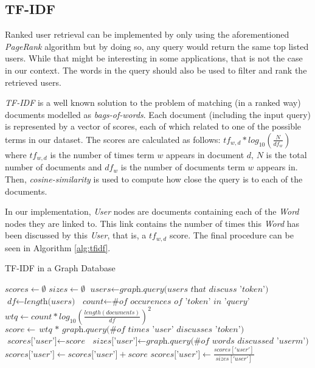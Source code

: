 \subsection{TF-IDF}

Ranked user retrieval can be implemented by only using the aforementioned \emph{PageRank} algorithm but by doing so, any query would return the same top listed users. While that might be interesting in some applications, that is not the case in our context. The words in the query should also be used to filter and rank the retrieved users.

\emph{TF-IDF} is a well known solution to the problem of matching (in a ranked way) documents modelled as \emph{bags-of-words}. Each document (including the input query) is represented by a vector of scores, each of which related to one of the possible terms in our dataset. The scores are calculated as follows: ${tf}_{w, d} * log_{10}(\frac{N}{{df}_{w}})$ where ${tf}_{w, d}$ is the number of times term $w$ appears in document $d$, $N$ is the total number of documents and ${df}_{w}$ is the number of documents term $w$ appears in. Then, \emph{cosine-similarity} is used to compute how close the query is to each of the documents.

In our implementation, \emph{User} nodes are documents containing each of the \emph{Word} nodes they are linked to. This link contains the number of times this \emph{Word} has been discussed by this \emph{User}, that is, a ${tf}_{w, d}$ score. The final procedure can be seen in Algorithm \ref{alg:tfidf}.

\begin{algorithm}
\caption{TF-IDF in a Graph Database}\label{alg:tfidf}
\begin{algorithmic}[1]
    \State $\textit{scores} \gets \emptyset$
    \State $\textit{sizes} \gets \emptyset$
        \State $\textit{users} \gets \textit{graph.query(users that discuss 'token')}$
        \State $\textit{df} \gets \textit{length(users)}$
        \State $\textit{count} \gets \textit{\# of occurences of 'token' in 'query'}$
        \State $\textit{wtq} \gets \textit{$count * log_{10}(\frac{length(documents)}{df})^2$}$
            \State $\textit{score} \gets \textit{wtq $*$ graph.query(\# of times 'user' discusses 'token')}$
                \State $\textit{scores['user']} \gets \textit{score}$
                \State $\textit{sizes['user']} \gets \textit{graph.query(\# of words discussed 'userm')}$
            \Else
                \State $\textit{scores['user']} \gets \textit{scores['user']} + \textit{score}$
            \EndIf       
        \EndFor
    \EndFor
        \State $\textit{scores['user']} \gets \textit{$\frac{scores['user']}{sizes['user']}$}$
    \EndFor
    \State {}
\EndProcedure
\end{algorithmic}
\end{algorithm}